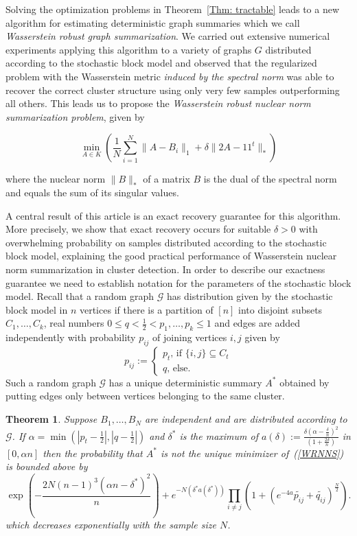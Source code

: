 \documentclass[12pt]{amsart}
\newtheorem{theorem}[lemma]{Theorem}
\theoremstyle{remark}
\newcommand{\grG}{{\mathcal{G}}}
\begin{document}
Solving the optimization problems in Theorem~\ref{Thm: tractable} leads to a new algorithm for estimating deterministic graph summaries which we call {\it Wasserstein robust graph summarization}. We carried out extensive numerical experiments applying this algorithm to a variety of graphs $G$ distributed according to the stochastic block model and observed that the regularized problem with the Wasserstein metric {\it induced by the spectral norm} was able to recover the correct cluster structure using only very few samples outperforming all others. This leads us to propose the {\it Wasserstein robust nuclear norm summarization problem}, given by

\begin{equation}\label{WRNNS}
\min_{A\in K} \left(\frac{1}{N}\sum_{i=1}^N\|A-B_i\|_1+ \delta\|2A-11^t\|_*\right) 
\end{equation}

where the nuclear norm $\|B\|_*$ of a matrix $B$ is the dual of the spectral norm and equals the sum of its singular values.

A central result of this article is an exact recovery guarantee for this algorithm. 
More precisely, we show that exact recovery occurs for suitable $\delta>0$ with overwhelming probability on samples distributed according to the stochastic block model, explaining the good practical performance of Wasserstein nuclear norm summarization in cluster detection. In order to describe our exactness guarantee we need to establish notation for the parameters of the stochastic block model. Recall that a random graph $\grG$ has distribution given by the stochastic block model in $n$ vertices if there is a partition of $[n]$ into disjoint subsets $C_1,\dots, C_k$, real numbers $0\leq q<\frac{1}{2}<p_1,\dots, p_k\leq 1$ and edges are added independently with probability $p_{ij}$ of joining vertices $i,j$ given by
\[p_{ij}:=\begin{cases}
p_t\text{, if $\{i,j\}\subseteq C_t$}\\
q\text{, else.}
\end{cases}
\] 
Such a random graph $\grG$ has a unique deterministic summary $A^*$ obtained by putting edges only between vertices belonging to the same cluster.

\begin{theorem}\label{thm. performance} Suppose $B_1,\dots, B_N$ are independent and are distributed according to $\grG$. If $\alpha = \min (|p_t-\frac{1}{2}|, |q-\frac{1}{2}|)$ and $\delta^*$ is the maximum of $a(\delta):=\frac{\delta\left(\alpha-\frac{\delta}{n}\right)^2}{\left(1+\frac{2\delta}{n}\right)}$ in $[0,\alpha n]$ then the probability that $A^*$ is not the unique minimizer of~(\ref{WRNNS}) is bounded above by
\[ \exp\left(-\frac{2N(n-1)^3(\alpha n-\delta^*)^2}{n}\right) + e^{-N\left(\delta^* a(\delta^*)\right)}\prod_{i\neq j}\left(1+ (e^{-4a}\widetilde{p_{ij}}+\widetilde{q_{ij}})^{\frac{N}{2}}\right).\] 
which decreases exponentially with the sample size $N$.
\end{theorem}
\end{document}
